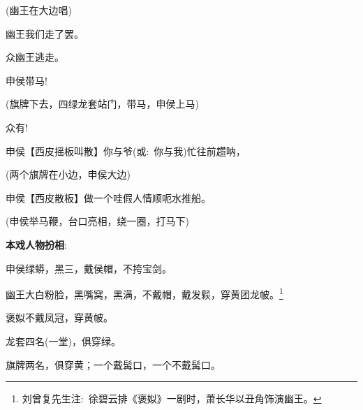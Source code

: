 {\textrm{(幽王{\hwfs 在大边唱})}


\textrm{幽王\hspace{30pt}我们走了罢。}

\textrm{众\hspace{41pt}幽王逃走。}

\textrm{申侯\hspace{30pt}带马!}

\textrm{(旗牌{\hwfs 下去}，{\hwfs 四绿}龙套{\hwfs 站门}，{\hwfs 带马}，申侯{\hwfs 上马})}


\textrm{众\hspace{41pt}有!}

\textrm{申侯\hspace{30pt}【{\akai 西皮摇板}{\footnotesize 叫散}】你与爷({\akai 或}:~你与我)忙往前趱{\footnotesize 呐}，}

\textrm{({\hwfs 两个}旗牌{\hwfs 在小边}，申侯{\hwfs 大边})}

\textrm{申侯\hspace{30pt}【{\akai 西皮散板}】做一个{\footnotesize 哇}假人情顺{\footnotesize 呃}水推船。}

\textrm{(申侯{\hwfs 举马鞭}，{\hwfs 台口亮相}，{\hwfs 绕一圈}，{\hwfs 打马下})}
}

\vspace{15pt}
{\bfseries\textrm{本戏人物扮相}}:~
\vspace{15pt}

申侯\hspace{30pt}绿蟒，黑三，戴侯帽，不挎宝剑。

幽王\hspace{30pt}大白粉脸，黑嘴窝，黑满，不戴帽，戴发鬏，穿黄团龙帔。\footnote{刘曾复先生注:~徐碧云排《褒姒》一剧时，萧长华以丑角饰演幽王。}%

褒姒\hspace{30pt}不戴凤冠，穿黄帔。

龙套\hspace{30pt}四名(一堂)，俱穿绿。

旗牌\hspace{30pt}两名，俱穿黄；一个戴髯口，一个不戴髯口。

